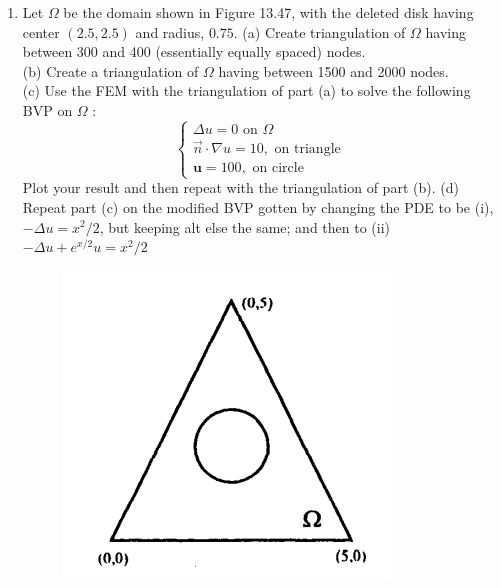 \documentclass[../main.tex]{subfiles}
\begin{document}
\begin{enumerate}
(a) In this domain, an observer at location $(-3,1.5)$ (left side) cannot tolerate a temperature greater than 50 . All edges except for the right edge are kept insultated $\vec{n} \cdot \nabla u=0$ while the right edge will be maintained at a certain temperature $u=T_{\text {hot }}$. What is the maximum value of $T_{\text {hot }}$ so the observer's requirement is met? Try to get your answer accurate to at least two decimals. For the PDE in the domain use the basic Laplace equation $\Delta u=0$.\\
(b) How would the answer in part (a) change if the rectangular length were to be doubled in length?\\
(c) How would the answer in part (a) change if the rectangular length were to have only half of its height?\\
(d) How would the answer in part (a) change if the square on the right were to have its sidelength doubled (but the left square is still kept the same)?\\
(e) How would the answer in part (a) change if the hot edge of the square on the right were the top edge rather than the right edge?
	\item Let $\Omega$ be the domain shown in Figure 13.47, with the deleted disk having center $(2.5,2.5)$ and radius, $0.75$.
(a) Create triangulation of $\Omega$ having between 300 and 400 (essentially equally spaced) nodes.\\
(b) Create a triangulation of $\Omega$ having between 1500 and 2000 nodes.\\
(c) Use the FEM with the triangulation of part (a) to solve the following BVP on $\Omega$ :
$$
\left\{\begin{array}{l}
\Delta u=0 \text { on } \Omega \\
\vec{n} \cdot \nabla u=10, \text { on triangle } \\
\mathbf{u}=100, \text { on circle }
\end{array}\right.
$$
Plot your result and then repeat with the triangulation of part (b).
(d) Repeat part (c) on the modified BVP gotten by changing the PDE to be (i), $-\Delta u=x^{2} / 2$, but  keeping alt else the same; and then to (ii)  $-\Delta u+e^{x / 2} u=x^{2} / 2$
\begin{figure}[H]
\includegraphics[width=0.5\linewidth]{34}

\end{figure}
\end{enumerate}
\end{document}
